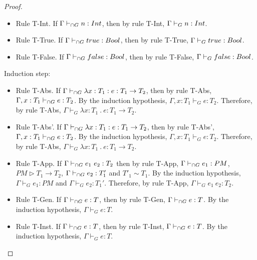 \documentclass[a4paper]{article}
\begin{document}
\begin{proof}
\begin{itemize}
    \item Rule T-Int.
    If $\Gamma \vdash_{\cap G} n : {Int}$, then by rule T-Int, $\Gamma \vdash_{G} n : {Int}$.
    \item Rule T-True.
    If $\Gamma \vdash_{\cap G} true : Bool$, then by rule T-True, $\Gamma \vdash_{G} true : Bool$.
    \item Rule T-False.
    If $\Gamma \vdash_{\cap G} false : Bool$, then by rule T-False, $\Gamma \vdash_{G} false : Bool$.
\end{itemize}
Induction step:
\begin{itemize}
    \item Rule T-Abs.
    If $\Gamma \vdash_{\cap G} \lambda x : T_1 : e : T_1 \rightarrow T_2$, then by rule T-Abs, $\Gamma, x : T_1 \vdash_{\cap G} e : T_2$.
    By the induction hypothesis, $\Gamma, x : T_1 \vdash_{G} e : T_2$.
    Therefore, by rule T-Abs, $\Gamma \vdash_{G} \lambda x : T_1\ .\ e : T_1 \rightarrow T_2$.
    \item Rule T-Abs'.
    If $\Gamma \vdash_{\cap G} \lambda x : T_1 : e : T_1 \rightarrow T_2$, then by rule T-Abs', $\Gamma, x : T_1 \vdash_{\cap G} e : T_2$.
    By the induction hypothesis, $\Gamma, x : T_1 \vdash_{G} e : T_2$.
    Therefore, by rule T-Abs, $\Gamma \vdash_{G} \lambda x : T_1\ .\ e : T_1 \rightarrow T_2$.
    \item Rule T-App.
    If $\Gamma \vdash_{\cap G} e_1\ e_2 : T_2$ then by rule T-App, $\Gamma \vdash_{\cap G} e_1 : PM$, $PM \rhd T_1 \rightarrow T_2$, $\Gamma \vdash_{\cap G} e_2 : T'_1$ and $T'_1 \sim T_1$.
    By the induction hypothesis, $\Gamma \vdash_{G} e_1 : PM$ and $\Gamma \vdash_{G} e_2 : T_1'$.
    Therefore, by rule T-App, $\Gamma \vdash_{G} e_1\ e_2 : T_2$.
    \item Rule T-Gen.
    If $\Gamma \vdash_{\cap G} e : T$, then by rule T-Gen, $\Gamma \vdash_{\cap G} e : T$.
    By the induction hypothesis, $\Gamma \vdash_{G} e : T$.
    \item Rule T-Inst.
    If $\Gamma \vdash_{\cap G} e : T$, then by rule T-Inst, $\Gamma \vdash_{\cap G} e : T$.
    By the induction hypothesis, $\Gamma \vdash_{G} e : T$.
\end{itemize}
\end{proof}
\end{document}
